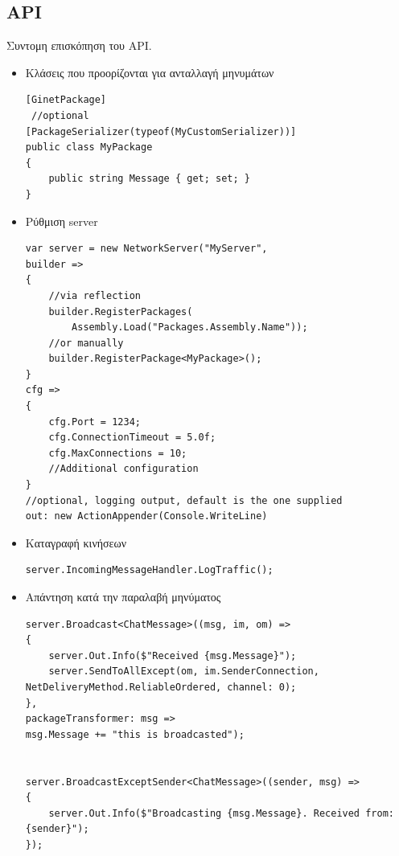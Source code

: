 	\subsection{API}
	Συντομη επισκόπηση του API.
	\begin{itemize}
		\item Κλάσεις που προορίζονται για ανταλλαγή μηνυμάτων
		\lstset{style=sharpc}
		\begin{lstlisting}
[GinetPackage]
 //optional
[PackageSerializer(typeof(MyCustomSerializer))]
public class MyPackage
{
    public string Message { get; set; }
}          
		\end{lstlisting}
		\item Ρύθμιση server
		\lstset{style=sharpc}
		\begin{lstlisting}     
var server = new NetworkServer("MyServer",
builder =>
{
	//via reflection
	builder.RegisterPackages(
		Assembly.Load("Packages.Assembly.Name"));
	//or manually
	builder.RegisterPackage<MyPackage>();
}
cfg =>
{
	cfg.Port = 1234;
	cfg.ConnectionTimeout = 5.0f;
	cfg.MaxConnections = 10;
	//Additional configuration
}
//optional, logging output, default is the one supplied			 
out: new ActionAppender(Console.WriteLine) 
		\end{lstlisting}
		\item Καταγραφή κινήσεων		
		\lstset{style=sharpc}
		\begin{lstlisting}
server.IncomingMessageHandler.LogTraffic();
		\end{lstlisting}		
		\item Απάντηση κατά την παραλαβή μηνύματος
		\lstset{style=sharpc}
		\begin{lstlisting}
server.Broadcast<ChatMessage>((msg, im, om) =>
{
	server.Out.Info($"Received {msg.Message}");
	server.SendToAllExcept(om, im.SenderConnection, NetDeliveryMethod.ReliableOrdered, channel: 0);
}, 
packageTransformer: msg => 
msg.Message += "this is broadcasted");	


server.BroadcastExceptSender<ChatMessage>((sender, msg) =>
{
	server.Out.Info($"Broadcasting {msg.Message}. Received from: {sender}");
});
		\end{lstlisting} 		


\end{itemize}

